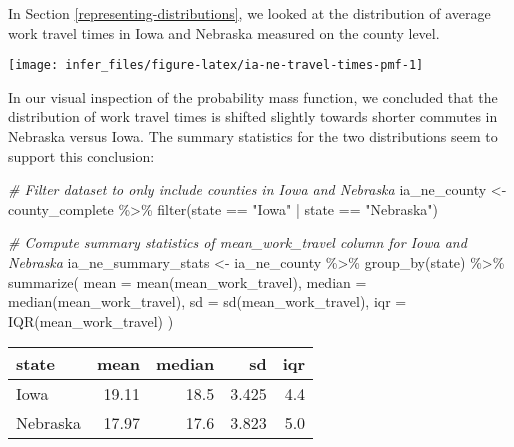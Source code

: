 \documentclass[
]{book}
\newenvironment{Shaded}{\begin{snugshade}}{\end{snugshade}}
\newcommand{\AttributeTok}[1]{\textcolor[rgb]{0.77,0.63,0.00}{#1}}
\newcommand{\CommentTok}[1]{\textcolor[rgb]{0.56,0.35,0.01}{\textit{#1}}}
\newcommand{\FunctionTok}[1]{\textcolor[rgb]{0.00,0.00,0.00}{#1}}
\newcommand{\NormalTok}[1]{#1}
\newcommand{\OtherTok}[1]{\textcolor[rgb]{0.56,0.35,0.01}{#1}}
\newcommand{\SpecialCharTok}[1]{\textcolor[rgb]{0.00,0.00,0.00}{#1}}
\newcommand{\StringTok}[1]{\textcolor[rgb]{0.31,0.60,0.02}{#1}}
\begin{document}
In Section \ref{representing-distributions}, we looked at the distribution of average work travel times in Iowa and Nebraska measured on the county level.

\begin{center}\texttt{[image: infer\_files/figure-latex/ia-ne-travel-times-pmf-1]} \end{center}

In our visual inspection of the probability mass function, we concluded that the distribution of work travel times is shifted slightly towards shorter commutes in Nebraska versus Iowa.
The summary statistics for the two distributions seem to support this conclusion:

\begin{Shaded}
\begin{Highlighting}[]
\CommentTok{\# Filter dataset to only include counties in Iowa and Nebraska}
\NormalTok{ia\_ne\_county }\OtherTok{\textless{}{-}}\NormalTok{ county\_complete }\SpecialCharTok{\%\textgreater{}\%}
  \FunctionTok{filter}\NormalTok{(state }\SpecialCharTok{==} \StringTok{"Iowa"} \SpecialCharTok{|}\NormalTok{ state }\SpecialCharTok{==} \StringTok{"Nebraska"}\NormalTok{)}

\CommentTok{\# Compute summary statistics of mean\_work\_travel column for Iowa and Nebraska}
\NormalTok{ia\_ne\_summary\_stats }\OtherTok{\textless{}{-}}\NormalTok{ ia\_ne\_county }\SpecialCharTok{\%\textgreater{}\%}
  \FunctionTok{group\_by}\NormalTok{(state) }\SpecialCharTok{\%\textgreater{}\%}
  \FunctionTok{summarize}\NormalTok{(}
    \AttributeTok{mean =} \FunctionTok{mean}\NormalTok{(mean\_work\_travel),}
    \AttributeTok{median =} \FunctionTok{median}\NormalTok{(mean\_work\_travel),}
    \AttributeTok{sd =} \FunctionTok{sd}\NormalTok{(mean\_work\_travel),}
    \AttributeTok{iqr =} \FunctionTok{IQR}\NormalTok{(mean\_work\_travel)}
\NormalTok{  )}
\end{Highlighting}
\end{Shaded}

\begin{table}
\centering
\begin{tabular}{l|r|r|r|r}
\hline
state & mean & median & sd & iqr\\
\hline
Iowa & 19.11 & 18.5 & 3.425 & 4.4\\
\hline
Nebraska & 17.97 & 17.6 & 3.823 & 5.0\\
\hline
\end{tabular}
\end{table}
\end{document}
